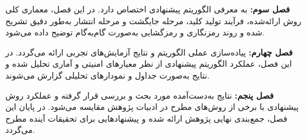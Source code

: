 \textbf{فصل سوم:} به معرفی الگوریتم پیشنهادی اختصاص دارد. در این فصل، معماری کلی روش ارائه‌شده، فرآیند تولید کلید، مرحله جایگشت و مرحله انتشار به‌طور دقیق تشریح شده و روند رمزنگاری و رمزگشایی به‌صورت گام‌به‌گام توضیح داده می‌شود.

\textbf{فصل چهارم:} پیاده‌سازی عملی الگوریتم و نتایج آزمایش‌های تجربی ارائه می‌گردد. در این فصل، عملکرد الگوریتم پیشنهادی از نظر معیارهای امنیتی و آماری تحلیل شده و نتایج به‌صورت جداول و نمودارهای تحلیلی گزارش می‌شوند.

\textbf{فصل پنجم:} نتایج به‌دست‌آمده مورد بحث و بررسی قرار گرفته و عملکرد روش پیشنهادی با برخی از روش‌های مطرح در ادبیات پژوهش مقایسه می‌شود. در پایان این فصل، جمع‌بندی نهایی پژوهش ارائه شده و پیشنهادهایی برای تحقیقات آینده مطرح می‌گردد.

